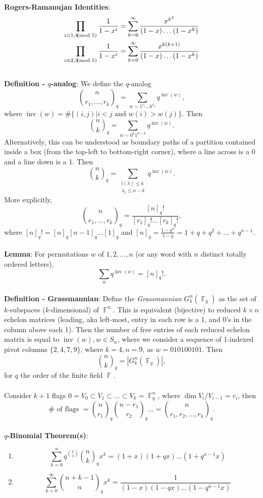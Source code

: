 \documentclass{article}
\DeclareMathOperator{\F}{\mathbb{F}}
\DeclareMathOperator{\inv}{inv}
\begin{document}
\textbf{Rogers-Ramanujan Identities}: \begin{align}
    \prod_{i \equiv 1, 4 \hspace{-0.5em} \pmod{5}} \frac{1}{1 - x^i} = \sum_{k = 0}^\infty \frac{x^{k^2}}{(1 - x) \dots (1 - x^k)} \\
    \prod_{i \equiv 2, 3 \hspace{-0.5em} \pmod{5}} \frac{1}{1 - x^i} = \sum_{k = 0}^\infty \frac{x^{k(k + 1)}}{(1 - x) \dots (1 - x^k)}
\end{align} \\
\textbf{Definition - $q$-analog}: We define the $q$-analog $$\binom{n}{r_1, \dots, r_k}_q = \sum_{w \sim 1^{r_1} \dots k^{r_k}} q^{\inv(w)},$$ where $\inv(w) = \#\{ (i, j)| i < j \text{ and } w(i) > w(j)\}$. Then $$\binom{n}{k}_q = \sum_{w \sim 0^k 1^{n - k}} q^{\inv(w)}.$$ Alternatively, this can be understood as boundary paths of a partition contained inside a box (from the top-left to bottom-right corner), where a line across is a 0 and a line down is a 1. Then $$\binom{n}{k}_q = \sum_{\substack{{l(\lambda) \leq k} \\ {\lambda_1 \leq n - k}}} q^{\inv(w)}.$$ More explicitly, $$\binom{n}{r_1, \dots, r_k}_q = \frac{[n]_q!}{[r_1]_q! \dots [r_k]_q!},$$ where $[n]_q! = [n]_q [n - 1]_q \dots [1]_q$ and $[n]_q = \frac{1 - q^n}{1 - q} = 1 + q + q^2 + \dots + q^{n - 1}.$ \\ \\
\textbf{Lemma}: For permutations $w$ of $1, 2, \dots, n$ (or any word with $n$ distinct totally ordered letters), $$\sum_w q^{\inv(w)} = [n]_q!.$$ \\
\textbf{Definition - Grassmannian}: Define the \textit{Grassmannian} $G_k^n(\F_q)$ as the set of $k$-subspaces ($k$-dimensional) of $\F^n$. This is equivalent (bijective) to reduced $k \times n$ echelon matrices (leading, aka left-most, entry in each row is a 1, and 0's in the column above each 1). Then the number of free entries of each reduced echelon matrix is equal to $\inv(w), w \in S_n$, where we consider a sequence of 1-indexed pivot columns $\{2, 4, 7, 9\}$, where $k = 4, n = 9$, as $w = 010100101$. Then $${n \choose k}_q = |G_k^n(\F_q)|,$$ for $q$ the order of the finite field $\F$. \\ \\
Consider $k + 1$ flags $0 = V_0 \subset V_1 \subset \dots \subset V_k = \F_q^n$, where $\dim V_i/V_{i - 1} = r_i$, then $$\# \text{ of flags } = {n \choose r_1}_q {n - r_1 \choose r_2}_q \dots = {n \choose r_1, r_2, \dots, r_k}_q.$$ \\
\textbf{$q$-Binomial Theorem(s)}: \begin{enumerate}
    \item $$\sum_{k = 0}^n q^{k \choose 2} {n \choose k}_q x^k = (1 + x)(1 + qx) \dots (1 + q^{n - 1}x)$$
    \item $$\sum_{k = 0}^\infty {n + k - 1 \choose n}_q x^k = \frac{1}{(1 - x)(1 - qx) \dots (1 - q^{n - 1}x)}$$
\end{enumerate}
\end{document}
